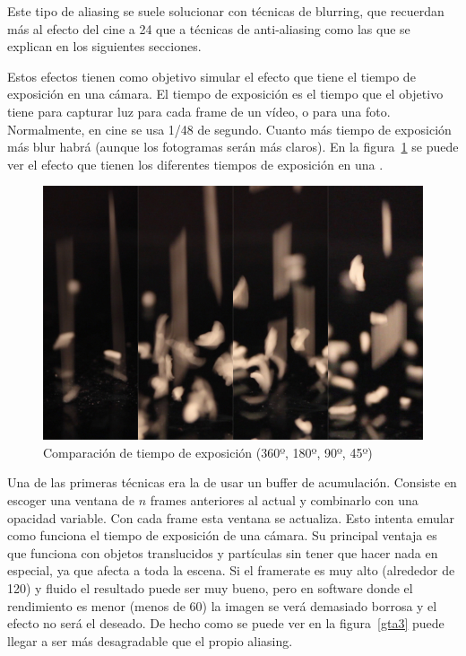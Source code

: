 \documentclass[withindex, glossary]{cam-thesis}
\begin{document}
Este tipo de aliasing se suele solucionar con técnicas de blurring, que recuerdan más al efecto del cine a 24 que a técnicas de anti-aliasing como las que se explican en los siguientes secciones.

Estos efectos tienen como objetivo simular el efecto que tiene el tiempo de exposición en una cámara. El tiempo de exposición es el tiempo que el objetivo tiene para capturar luz para cada frame de un vídeo, o para una foto. Normalmente, en cine se usa 1/48 de segundo\cite{shuttertips}. Cuanto más tiempo de exposición más blur habrá (aunque los fotogramas serán más claros). En la figura~\ref{shutter} se puede ver el efecto que tienen los diferentes tiempos de exposición en una \@.

\begin{figure}[!htbp]
    \includegraphics[width=.8\linewidth]{figures/shutter.jpg}
    \caption{Comparación de tiempo de exposición (360º, 180º, 90º, 45º)\cite{shuttertips}\label{shutter}}
\end{figure}

Una de las primeras técnicas era la de usar un buffer de acumulación. Consiste en escoger una ventana de $n$ frames anteriores al actual y combinarlo con una opacidad variable. Con cada frame esta ventana se actualiza. Esto intenta emular como funciona el tiempo de exposición de una cámara. Su principal ventaja es que funciona con objetos translucidos y partículas sin tener que hacer nada en especial, ya que afecta a toda la escena. Si el framerate es muy alto (alrededor de 120) y fluido el resultado puede ser muy bueno, pero en software donde el rendimiento es menor (menos de 60) la imagen se verá demasiado borrosa y el efecto no será el deseado. De hecho como se puede ver en la figura~\ref{gta3} puede llegar a ser más desagradable que el propio aliasing.
\end{document}
